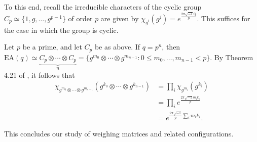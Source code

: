 \documentclass[../../../main]{subfiles}
\begin{document}
To this end, recall the irreducible characters of the cyclic group $C_p \simeq \{1,g,\dots,g^{p-1}\}$ of order $p$ are given by $\chi_{g^i}(g^j) = e^\frac{2\pi\sqrt{-1}ij}{p}$. This suffices for the case in which the group is cyclic.

Let $p$ be a prime, and let $C_p$ be as above. If $q=p^n$, then $\text{EA}(q) \simeq \underbrace{C_p \otimes \cdots \otimes C_p}_n = \{g^{m_0} \otimes \cdots \otimes g^{m_{n-1}} : 0 \leq m_0,\dots,m_{n-1} < p\}$. By Theorem 4.21 of \cite{isaacs}, it follows that
\begin{align*}
 \chi_{g^{m_0} \otimes \cdots \otimes g^{m_{n-1}}}(g^{k_0} \otimes \cdots \otimes g^{k_{n-1}}) &= \prod_i \chi_{g^{m_i}}(g^{k_i}) \\
 &= \prod_i e^\frac{2\pi\sqrt{-1}m_ik_i}{p} \\
 &= e^{\frac{2\pi\sqrt{-1}}{p}\sum_im_ik_i}.
\end{align*}

This concludes our study of weighing matrices and related configurations.

\biblio
\end{document}
